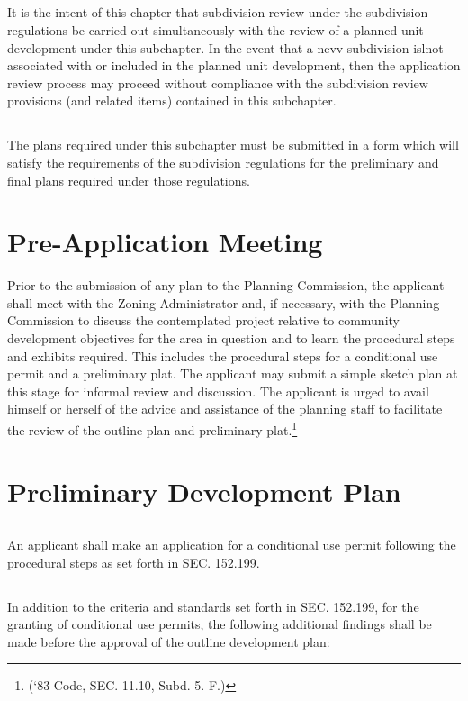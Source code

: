 \subsection{}
It is the intent of this chapter that subdivision review under the subdivision regulations be carried out simultaneously with the review of a planned unit development under this subchapter. In the event that a nevv subdivision islnot associated with or included in the planned unit development, then the application review process may proceed without compliance with the subdivision review provisions (and related items) contained in this subchapter.
\subsection{}
The plans required under this subchapter must be submitted in a form which will satisfy the requirements of the subdivision regulations for the preliminary and final plans required under those regulations.


\section{Pre-Application Meeting}
Prior to the submission of any plan to the Planning Commission, the applicant shall meet with the Zoning Administrator and, if necessary, with the Planning Commission to discuss the contemplated project relative to community development objectives for the area in question and to learn the procedural steps and exhibits required. This includes the procedural steps for a conditional use permit and a preliminary plat. The applicant may submit a simple sketch plan at this stage for informal review and discussion.  The applicant is urged to avail himself or herself of the advice and assistance of the planning staff to facilitate the review of the outline plan and preliminary plat.\footnote{(‘83 Code, SEC. 11.10, Subd. 5. F.)}


\section{Preliminary Development Plan}
\subsection{}
An applicant shall make an application for a conditional use permit following the procedural steps as set forth in SEC. 152.199.
\subsection{}
In addition to the criteria and standards set forth in SEC. 152.199, for the granting of conditional use permits, the following additional findings shall be made before the approval of the outline development plan:
